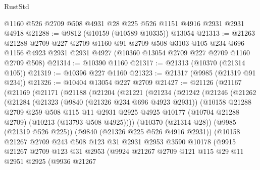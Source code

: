 \begin{lexlean}{RustStd}
\begin{coremodule}
    @1160
    @526
    @2709
    @508
    @4931
    @28
    @225
    @526
    @1151
    @4916
    @2931
    @2931
    @4918
@21288 := @9812 (@10159 (@10589 @10335)) @13054
@21313 := @21263
    @21288
    @2709
    @227
    @2709
    @1160
    @91
    @2709
    @508
    @3103
    @105
    @234
    @696
    @1156
    @4923
    @2931
    @2931
    @4927
    (@10360 @13054 @2709 @227 @2709 @1160 @2709 @508)
@21314 := @10390 @1160
@21317 := @21313 (@10370 (@21314 @105))
@21319 := @10396 @227 @1160
@21323 := @21317 (@9985 (@21319 @91 @234))
@21326 := @10404 @13054 @227 @2709
@21427 := @21126
    (@21167
      (@21169
        (@21171
          (@21188
            (@21204
              (@21221
                (@21234
                  (@21242
                    (@21246
                      (@21262
                        (@21284
                          (@21323
                            (@9840 (@21326 @234 @696 @4923 @2931))
                            (@10158
                              @21288
                              @2709
                              @259
                              @508
                              @115
                              @11
                              @2931
                              @2925
                              @4925
                              @10177
                              (@10704 @21288 @2709)
                              (@10213 (@13793 @508 @4925))))
                          (@10370 (@21314 @28))
                          (@9985 (@21319 @526 @225))
                          (@9840 (@21326 @225 @526 @4916 @2931))
                          (@10158
                            @21267
                            @2709
                            @243
                            @508
                            @123
                            @31
                            @2931
                            @2953
                            @3590
                            @10178
                            (@9915
                              @21267
                              @2709
                              @123
                              @31
                              @2953
                              (@9924
                                @21267
                                @2709
                                @121
                                @115
                                @29
                                @11
                                @2951
                                @2925
                                (@9936
                                  @21267

\end{coremodule}
\end{lexlean}
